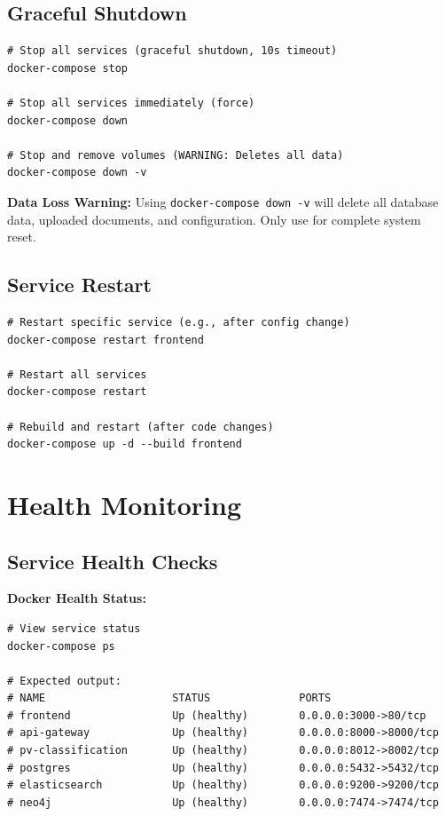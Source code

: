 \subsection{Graceful Shutdown}

\begin{commandbox}
\begin{lstlisting}[style=bashstyle]
# Stop all services (graceful shutdown, 10s timeout)
docker-compose stop

# Stop all services immediately (force)
docker-compose down

# Stop and remove volumes (WARNING: Deletes all data)
docker-compose down -v
\end{lstlisting}
\end{commandbox}

\begin{warningbox}
\textbf{Data Loss Warning:} Using \texttt{docker-compose down -v} will delete all database data, uploaded documents, and configuration. Only use for complete system reset.
\end{warningbox}

\subsection{Service Restart}

\begin{commandbox}
\begin{lstlisting}[style=bashstyle]
# Restart specific service (e.g., after config change)
docker-compose restart frontend

# Restart all services
docker-compose restart

# Rebuild and restart (after code changes)
docker-compose up -d --build frontend
\end{lstlisting}
\end{commandbox}

\section{Health Monitoring}

\subsection{Service Health Checks}

\textbf{Docker Health Status:}
\begin{commandbox}
\begin{lstlisting}[style=bashstyle]
# View service status
docker-compose ps

# Expected output:
# NAME                    STATUS              PORTS
# frontend                Up (healthy)        0.0.0.0:3000->80/tcp
# api-gateway             Up (healthy)        0.0.0.0:8000->8000/tcp
# pv-classification       Up (healthy)        0.0.0.0:8012->8002/tcp
# postgres                Up (healthy)        0.0.0.0:5432->5432/tcp
# elasticsearch           Up (healthy)        0.0.0.0:9200->9200/tcp
# neo4j                   Up (healthy)        0.0.0.0:7474->7474/tcp
\end{lstlisting}
\end{commandbox}

